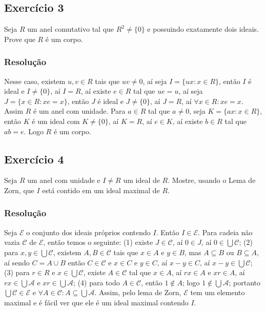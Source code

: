 \documentclass[10pt,a4paper]{article}
\begin{document}
\subsection*{Exercício 3}

Seja $R$ um anel comutativo tal que $R^2\neq\{0\}$ e possuindo exatamente dois ideais. Prove que $R$ é um corpo.

\subsubsection*{Resolução}

Nesse caso, existem $u,v\in R$ tais que $uv\neq 0$, aí seja $I=\{ux:x\in R\}$, então $I$ é ideal e $I\neq\{0\}$, aí $I=R$, aí existe $e\in R$ tal que $ue=u$, aí seja $J=\{x\in R:xe=x\}$, então $J$ é ideal e $J\neq\{0\}$, aí $J=R$, aí $\forall x\in R:xe=x$. Assim $R$ é um anel com unidade. Para $a\in R$ tal que $a\neq 0$, seja $K=\{ax:x\in R\}$, então $K$ é um ideal com $K\neq \{0\}$, aí $K=R$, aí $e\in K$, aí existe $b\in R$ tal que $ab=e$. Logo $R$ é um corpo.

\subsection*{Exercício 4}

Seja $R$ um anel com unidade e $I\neq R$ um ideal de $R$. Mostre, usando o Lema de Zorn, que $I$ está contido em um ideal maximal de $R$.

\subsubsection*{Resolução}

Seja $\mathcal{E}$ o conjunto dos ideais próprios contendo $I$. Então $I\in\mathcal{E}$. Para cadeia não vazia $\mathcal{C}$ de $\mathcal{E}$, então temos o seguinte: (1) existe $J\in\mathcal{C}$, aí $0\in J$, aí $0\in\bigcup\mathcal{C}$; (2) para $x,y\in\bigcup\mathcal{C}$, existem $A,B\in\mathcal{C}$ tais que $x\in A$ e $y\in B$, mas $A\subseteq B$ ou $B\subseteq A$, aí sendo $C=A\cup B$ então $C\in\mathcal{C}$ e $x\in C$ e $y\in C$, aí $x-y\in C$, aí $x-y\in\bigcup\mathcal{C}$; (3) para $r\in R$ e $x\in\bigcup\mathcal{C}$, existe $A\in\mathcal{C}$ tal que $x\in A$, aí $rx\in A$ e $xr\in A$, aí $rx\in\bigcup\mathcal{A}$ e $xr\in\bigcup\mathcal{A}$; (4) para todo $A\in\mathcal{C}$, então $1\notin A$; logo $1\notin\bigcup\mathcal{A}$; portanto $\bigcup\mathcal{C}\in\mathcal{E}$ e $\forall A\in\mathcal{C}:A\subseteq\bigcup\mathcal{A}$. Assim, pelo lema de Zorn, $\mathcal{E}$ tem um elemento maximal e é fácil ver que ele é um ideal maximal contendo $I$.
\end{document}
